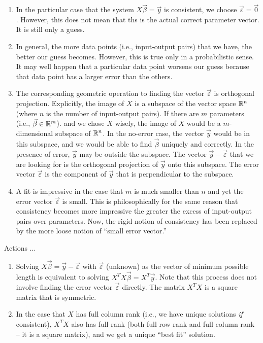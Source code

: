 \documentclass[10pt]{amsart}
\begin{document}
\begin{enumerate}
  (if we chose it well), $X$ had full column rank, this gives the
  unique ``best''choice of $\vec{\beta}$. Note also that ``length''
  here refers to Euclidean length (square root of sum of squares of
  coordinates) when we are doing an {\em ordinary least squares
    regression} (the default type of regression) but we could use
  alternative notions of length in other types of regressions.
\item In the particular case that the system $X \vec{\beta} = \vec{y}$
  is consistent, we choose $\vec{\varepsilon} = \vec{0}$. However,
  this does not mean that ths is the actual correct parameter
  vector. It is still only a guess.
\item In general, the more data points (i.e., input-output pairs) that
  we have, the better our guess becomes. However, this is true only in
  a probabilistic sense. It may well happen that a particular data
  point worsens our guess because that data point has a larger error
  than the others.
\item The corresponding geometric operation to finding the vector
  $\vec{\varepsilon}$ is orthogonal projection. Explicitly, the image
  of $X$ is a subspace of the vector space $\mathbb{R}^n$ (where $n$ is the
  number of input-output pairs). If there are $m$ parameters (i.e.,
  $\vec{\beta} \in \mathbb{R}^m$). and we chose $X$ wisely, the image of $X$
  would be a $m$-dimensional subspace of $\mathbb{R}^n$. In the no-error case,
  the vector $\vec{y}$ would be in this subspace, and we would be able
  to find $\vec{\beta}$ uniquely and correctly. In the presence of
  error, $\vec{y}$ may be outside the subspace. The vector $\vec{y} -
  \vec{\varepsilon}$ that we are looking for is the orthogonal
  projection of $\vec{y}$ onto this subspace. The error vector
  $\vec{\varepsilon}$ is the component of $\vec{y}$ that is
  perpendicular to the subspace.
\item A fit is impressive in the case that $m$ is much smaller than
  $n$ and yet the error vector $\vec{\varepsilon}$ is small. This is
  philosophically for the same reason that consistency becomes more
  impressive the greater the excess of input-output pairs over
  parameters. Now, the rigid notion of consistency has been replaced
  by the more loose notion of ``small error vector.''
\end{enumerate}

Actions ...

\begin{enumerate}
\item Solving $X\vec{\beta} = \vec{y} - \vec{\varepsilon}$ with
  $\vec{\varepsilon}$ (unknown) as the vector of minimum possible
  length is equivalent to solving $X^TX\vec{\beta} = X^T\vec{y}$. Note
  that this process does not involve finding the error vector
  $\vec{\varepsilon}$ directly. The matrix $X^TX$ is a square matrix
  that is symmetric.
\item In the case that $X$ has full column rank (i.e., we have unique
  solutions {\em if} consistent), $X^TX$ also has full rank (both full
  row rank and full column rank -- it is a square matrix), and we get a
  unique ``best fit'' solution.
\end{enumerate}
\end{document}
